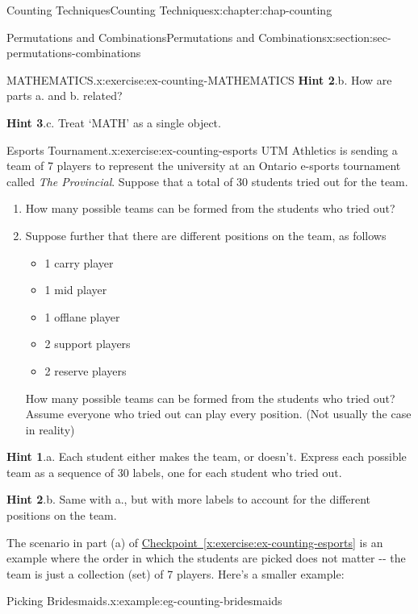 \documentclass[oneside,10pt,]{book}
\newcommand{\blocktitlefont}{\relax}
\newcommand{\xreffont}{\relax}
\numberwithin{equation}{section}
\begin{document}
\begin{chapterptx}{Counting Techniques}{}{Counting Techniques}{}{}{x:chapter:chap-counting}
\begin{sectionptx}{Permutations and Combinations}{}{Permutations and Combinations}{}{}{x:section:sec-permutations-combinations}
\begin{inlineexercise}{MATHEMATICS.}{x:exercise:ex-counting-MATHEMATICS}
\noindent\textbf{\blocktitlefont Hint 2}.\hypertarget{g:hint:id424430}{}\quad{}b. How are parts a. and b. related?%
\par\smallskip%
\noindent\textbf{\blocktitlefont Hint 3}.\hypertarget{g:hint:id424436}{}\quad{}c. Treat `MATH' as a single object.%
\end{inlineexercise}
\begin{inlineexercise}{Esports Tournament.}{x:exercise:ex-counting-esports}%
UTM Athletics is sending a team of 7 players to represent the university at an Ontario e-sports tournament called \emph{The Provincial}. Suppose that a total of 30 students tried out for the team.%
\begin{enumerate}[label=(\alph*)]
\item{}How many possible teams can be formed from the students who tried out?%
\item{}Suppose further that there are different positions on the team, as follows%
\begin{itemize}[label=\textbullet]
\item{}1 carry player%
\item{}1 mid player%
\item{}1 offlane player%
\item{}2 support players%
\item{}2 reserve players%
\end{itemize}
How many possible teams can be formed from the students who tried out? Assume everyone who tried out can play every position. (Not usually the case in reality\textellipsis{})%
\end{enumerate}
%
\par\smallskip%
\noindent\textbf{\blocktitlefont Hint 1}.\hypertarget{g:hint:id424514}{}\quad{}a. Each student either makes the team, or doesn't. Express each possible team as a sequence of 30 labels, one for each student who tried out.%
\par\smallskip%
\noindent\textbf{\blocktitlefont Hint 2}.\hypertarget{g:hint:id424535}{}\quad{}b. Same with a., but with more labels to account for the different positions on the team.%
\end{inlineexercise}
The scenario in part (a) of \hyperref[x:exercise:ex-counting-esports]{Checkpoint~{\xreffont\ref{x:exercise:ex-counting-esports}}} is an example where the order in which the students are picked does not matter -{}-{} the team is just a collection (set) of 7 players. Here's a smaller example:%
\begin{example}{Picking Bridesmaids.}{x:example:eg-counting-bridesmaids}%

\end{example}
\end{sectionptx}
\end{chapterptx}
\end{document}

